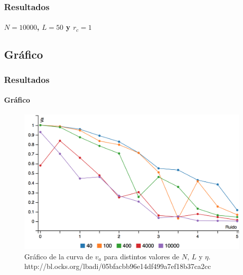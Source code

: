 \documentclass[hyperref={pdfpagelayout=SinglePage}]{beamer}
\begin{document}
\begin{frame}
\frametitle{Resultados}
\framesubtitle{$N = 10000$, $L = 50$ y $r_{c} = 1$}
\begin{center}
\begin{table}[h]
\centering
{}
\caption{Datos de la curva de $v_{a}$ para $N = 10000$, $L = 50$ y $r_{c} = 1$.}
\end{table}
\end{center}
\end{frame}

\subsection{Gráfico}

\begin{frame}
\frametitle{Resultados}
\framesubtitle{Gráfico}
\begin{figure}[H]
        \centering
        \includegraphics[width=\textheight]{graphic.png}
        \caption{Gráfico de la curva de $v_{a}$ para distintos valores de $N$, $L$ y $\eta$. http://bl.ocks.org/lbadi/05bfacbb96e14df499a7ef18b37ca2cc}
\end{figure}
\end{frame}
\end{document}
